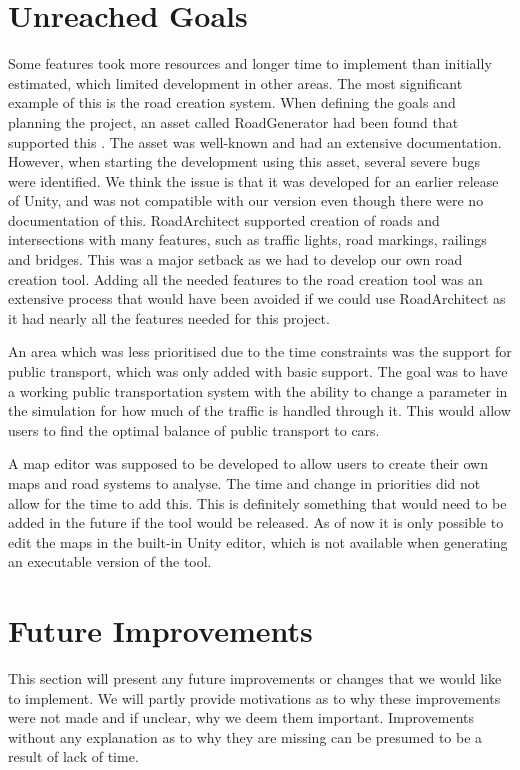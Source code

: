 
\section{Unreached Goals}
    Some features took more resources and longer time to implement than initially estimated, which limited development in other areas. The most significant example of this is the road creation system. When defining the goals and planning the project, an asset called RoadGenerator had been found that supported this \cite{road-architect}. The asset was well-known and had an extensive documentation. However, when starting the development using this asset, several severe bugs were identified. We think the issue is that it was developed for an earlier release of Unity, and was not compatible with our version even though there were no documentation of this. RoadArchitect supported creation of roads and intersections with many features, such as traffic lights, road markings, railings and bridges. This was a major setback as we had to develop our own road creation tool. Adding all the needed features to the road creation tool was an extensive process that would have been avoided if we could use RoadArchitect as it had nearly all the features needed for this project.

    An area which was less prioritised due to the time constraints was the support for public transport, which was only added with basic support. The goal was to have a working public transportation system with the ability to change a parameter in the simulation for how much of the traffic is handled through it. This would allow users to find the optimal balance of public transport to cars.

    A map editor was supposed to be developed to allow users to create their own maps and road systems to analyse. The time and change in priorities did not allow for the time to add this. This is definitely something that would need to be added in the future if the tool would be released. As of now it is only possible to edit the maps in the built-in Unity editor, which is not available when generating an executable version of the tool.

\section{Future Improvements}
    This section will present any future improvements or changes that we would like to implement. We will partly provide motivations as to why these improvements were not made and if unclear, why we deem them important. Improvements without any explanation as to why they are missing can be presumed to be a result of lack of time.
    
